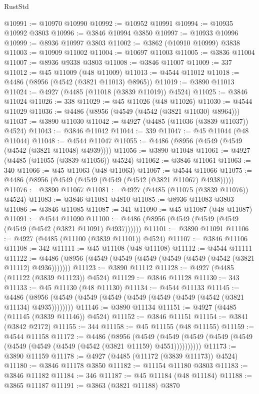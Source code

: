 \begin{lexlean}{RustStd}
\begin{coremodule}
@10991 := @10970 @10990
@10992 := @10952 @10991
@10994 := @10935 @10992 @3803
@10996 := @3846 @10994 @3850
@10997 := @10933 @10996
@10999 := @8936 @10997 @3803
@11002 := @3862 (@10910 @10999) @3838
@11003 := @10909 @11002
@11004 := @10697 @11003
@11005 := @3836 @11004
@11007 := @8936 @9338 @3803
@11008 := @3846 @11007
@11009 := 337
@11012 := @45 @11009 (@48 @11009)
@11013 := @4544 @11012
@11018 := @4486 (@8956 (@4542 (@3821 @11013) @8965))
@11019 := @3890 @11013
@11024 := @4927 (@4485 (@11018 (@3839 @11019)) @4524)
@11025 := @3846 @11024
@11026 := 338
@11029 := @45 @11026 (@48 @11026)
@11030 := @4544 @11029
@11036 := @4486 (@8956 (@4549 (@4542 (@3821 @11030) @8964)))
@11037 := @3890 @11030
@11042 := @4927 (@4485 (@11036 (@3839 @11037)) @4524)
@11043 := @3846 @11042
@11044 := 339
@11047 := @45 @11044 (@48 @11044)
@11048 := @4544 @11047
@11055 := @4486 (@8956 (@4549 (@4549 (@4542 (@3821 @11048) @4939))))
@11056 := @3890 @11048
@11061 := @4927 (@4485 (@11055 (@3839 @11056)) @4524)
@11062 := @3846 @11061
@11063 := 340
@11066 := @45 @11063 (@48 @11063)
@11067 := @4544 @11066
@11075 := @4486 (@8956 (@4549 (@4549 (@4549 (@4542 (@3821 @11067) @4938)))))
@11076 := @3890 @11067
@11081 := @4927 (@4485 (@11075 (@3839 @11076)) @4524)
@11083 := @3846 @11081 @4810
@11085 := @8936 @11083 @3803
@11086 := @3846 @11085
@11087 := 341
@11090 := @45 @11087 (@48 @11087)
@11091 := @4544 @11090
@11100 := @4486 (@8956 (@4549 (@4549 (@4549 (@4549 (@4542 (@3821 @11091) @4937))))))
@11101 := @3890 @11091
@11106 := @4927 (@4485 (@11100 (@3839 @11101)) @4524)
@11107 := @3846 @11106
@11108 := 342
@11111 := @45 @11108 (@48 @11108)
@11112 := @4544 @11111
@11122 := @4486 (@8956 (@4549 (@4549 (@4549 (@4549 (@4549 (@4542 (@3821 @11112) @4936)))))))
@11123 := @3890 @11112
@11128 := @4927 (@4485 (@11122 (@3839 @11123)) @4524)
@11129 := @3846 @11128
@11130 := 343
@11133 := @45 @11130 (@48 @11130)
@11134 := @4544 @11133
@11145 := @4486 (@8956 (@4549 (@4549 (@4549 (@4549 (@4549 (@4549 (@4542 (@3821 @11134) @4935))))))))
@11146 := @3890 @11134
@11151 := @4927 (@4485 (@11145 (@3839 @11146)) @4524)
@11152 := @3846 @11151
@11154 := @3841 (@3842 @2172)
@11155 := 344
@11158 := @45 @11155 (@48 @11155)
@11159 := @4544 @11158
@11172 := @4486
    (@8956
      (@4549 (@4549 (@4549 (@4549 (@4549 (@4549 (@4549 (@4549 (@4542 (@3821 @11159) @4551))))))))))
@11173 := @3890 @11159
@11178 := @4927 (@4485 (@11172 (@3839 @11173)) @4524)
@11180 := @3846 @11178 @3850
@11182 := @11154 @11180 @3803
@11183 := @3846 @11182
@11184 := 346
@11187 := @45 @11184 (@48 @11184)
@11188 := @3865 @11187
@11191 := @3863 (@3821 @11188) @3870

\end{coremodule}
\end{lexlean}
